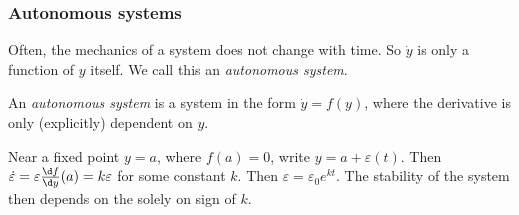 \documentclass[a4paper]{article}
\begin{document}
\subsubsection{Autonomous systems}
Often, the mechanics of a system does not change with time. So $\dot y$ is only a function of $y$ itself. We call this an \emph{autonomous system}.

\begin{defi}
  An \emph{autonomous system} is a system in the form $\dot y = f(y)$, where the derivative is only (explicitly) dependent on $y$.
\end{defi}

Near a fixed point $y = a$, where $f(a) = 0$, write $y = a + \varepsilon(t)$. Then $\dot \varepsilon = \varepsilon\frac{\d f}{\d y}(a) = k\varepsilon$ for some constant $k$. Then $\varepsilon = \varepsilon_0 e^{kt}$. The stability of the system then depends on the solely on sign of $k$.
\end{document}
